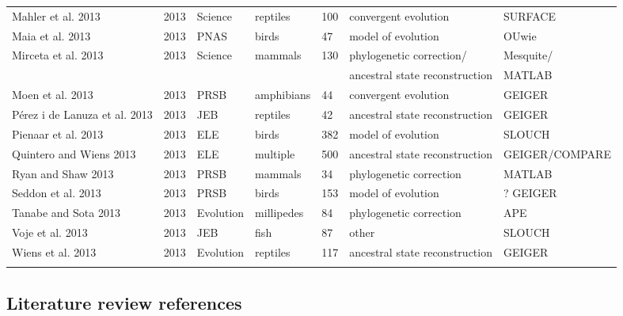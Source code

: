 \begin{landscape}
\begin{center}
\begin{longtable}{p{6cm}llllll}
Mahler et al. 2013    &   2013    &   Science &   reptiles    &   100 &   convergent evolution    &   SURFACE \\
Maia et al. 2013  &   2013    &   PNAS    &   birds   &   47  &   model of evolution  &   OUwie   \\
Mirceta et al. 2013   &   2013    &   Science &   mammals &   130 &   phylogenetic correction/    &   Mesquite/   \\
    &       &       &       &       &   ancestral state reconstruction  &   MATLAB  \\
Moen et al. 2013  &   2013    &   PRSB    &   amphibians  &   44  &   convergent evolution    &   GEIGER  \\
Pérez i de Lanuza et al. 2013 &   2013    &   JEB &   reptiles    &   42  &   ancestral state reconstruction  &   GEIGER  \\
Pienaar et al. 2013   &   2013    &   ELE &   birds   &   382 &   model of evolution  &   SLOUCH  \\
Quintero and Wiens 2013   &   2013    &   ELE &   multiple    &   500 &   ancestral state reconstruction  &   GEIGER/COMPARE  \\
Ryan and Shaw 2013    &   2013    &   PRSB    &   mammals &   34  &   phylogenetic correction &   MATLAB  \\
Seddon et al. 2013    &   2013    &   PRSB    &   birds   &   153 &   model of evolution  &   ? GEIGER  \\
Tanabe and Sota 2013  &   2013    &   Evolution   &   millipedes  &   84  &   phylogenetic correction &   APE \\
Voje et al. 2013  &   2013    &   JEB &   fish    &   87  &   other   &   SLOUCH  \\
Wiens et al. 2013 &   2013    &   Evolution   &   reptiles    &   117 &   ancestral state reconstruction  &   GEIGER  \\
\hline
\label{table:litreview}
\end{longtable}
\end{center}
\end{landscape}
   






\subsection{Literature review references}

